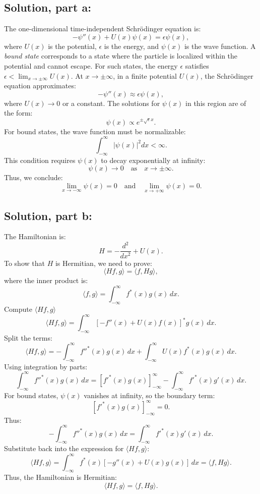 \documentclass[12pt]{article}
\begin{document}
    \subsection*{Solution, part a:}
        The one-dimensional time-independent Schrödinger equation is:
        \[
        -\psi''(x) + U(x)\psi(x) = \epsilon \psi(x),
        \]
        where \(U(x)\) is the potential, \(\epsilon\) is the energy, and \(\psi(x)\) is the wave function. 
        A \textit{bound state} corresponds to a state where the particle is localized within the potential and cannot escape. For such states, the energy \(\epsilon\) satisfies \(\epsilon < \lim_{x \to \pm\infty} U(x)\).
        At \(x \to \pm\infty\), in a finite potential \(U(x)\), the Schrödinger equation approximates:
        \[
        -\psi''(x) \approx \epsilon \psi(x),
        \]
        where \(U(x) \to 0\) or a constant. The solutions for \(\psi(x)\) in this region are of the form:
        \[
        \psi(x) \propto e^{\pm \sqrt{\epsilon} x}.
        \]
        For bound states, the wave function must be normalizable:
        \[
        \int_{-\infty}^\infty |\psi(x)|^2 dx < \infty.
        \]
        This condition requires \(\psi(x)\) to decay exponentially at infinity:
        \[
        \psi(x) \to 0 \quad \text{as} \quad x \to \pm\infty.
        \]
        Thus, we conclude:
        \[
        \boxed{\lim_{x \to -\infty} \psi(x) = 0 \quad \text{and} \quad \lim_{x \to +\infty} \psi(x) = 0.}
        \]
    
    \subsection*{Solution, part b:}
        The Hamiltonian is:
        \[
        H = -\frac{d^2}{dx^2} + U(x).
        \]
        To show that \(H\) is Hermitian, we need to prove:
        \[
        \langle Hf, g \rangle = \langle f, Hg \rangle,
        \]
        where the inner product is:
        \[
        \langle f, g \rangle = \int_{-\infty}^\infty f^*(x) g(x) \, dx.
        \]
        Compute \(\langle Hf, g \rangle\)
        \[
        \langle Hf, g \rangle = \int_{-\infty}^\infty \left[ -f''(x) + U(x)f(x) \right]^* g(x) \, dx.
        \]
        Split the terms:
        \[
        \langle Hf, g \rangle = -\int_{-\infty}^\infty f''^*(x) g(x) \, dx + \int_{-\infty}^\infty U(x)f^*(x) g(x) \, dx.
        \]
        Using integration by parts:
        \[
        \int_{-\infty}^\infty f''^*(x) g(x) \, dx = \left[f'^*(x) g(x)\right]_{-\infty}^\infty - \int_{-\infty}^\infty f'^*(x) g'(x) \, dx.
        \]
        For bound states, \(\psi(x)\) vanishes at infinity, so the boundary term:
        \[
        \left[f'^*(x) g(x)\right]_{-\infty}^\infty = 0.
        \]
        Thus:
        \[
        -\int_{-\infty}^\infty f''^*(x) g(x) \, dx = \int_{-\infty}^\infty f'^*(x) g'(x) \, dx.
        \]
        Substitute back into the expression for \(\langle Hf, g \rangle \):
        \[
        \langle Hf, g \rangle = \int_{-\infty}^\infty f^*(x) \left[ -g''(x) + U(x)g(x) \right] \, dx = \langle f, Hg \rangle.
        \]
        Thus, the Hamiltonian is Hermitian:
        \[
        \boxed{\langle Hf, g \rangle = \langle f, Hg \rangle}.
        \]
\end{document}
